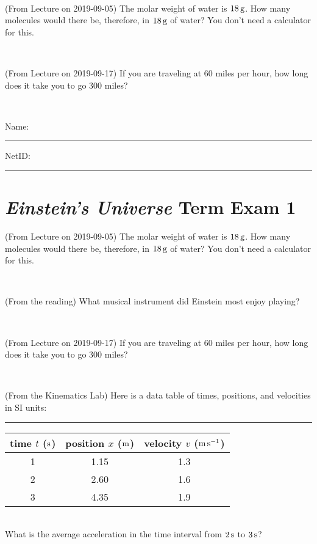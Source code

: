 \documentclass[12pt, letterpaper]{article}
\begin{document}
\vfill ~

\begin{problem} (From Lecture on 2019-09-05)
The molar weight of water is $18\,\mathrm{g}$. How many molecules would there
be, therefore, in $18\,\mathrm{g}$ of water? You don't need a calculator for
this.
\end{problem}


\vfill ~

\begin{problem} (From Lecture on 2019-09-17)
If you are traveling at 60 miles per hour, how long does
it take you to go 300 miles?
\end{problem}


\vfill ~


\cleardoublepage



\noindent
Name: \rule[-1ex]{0.60\textwidth}{0.1pt}
NetID: \rule[-1ex]{0.20\textwidth}{0.1pt}

\section*{\textsl{Einstein's Universe} Term Exam 1}
\setcounter{problem}{1}


\begin{problem} (From Lecture on 2019-09-05)
The molar weight of water is $18\,\mathrm{g}$. How many molecules would there
be, therefore, in $18\,\mathrm{g}$ of water? You don't need a calculator for
this.
\end{problem}


\vfill ~

\begin{problem} (From the reading)
What musical instrument did Einstein most enjoy playing?
\end{problem}


\vfill ~

\begin{problem} (From Lecture on 2019-09-17)
If you are traveling at 60 miles per hour, how long does
it take you to go 300 miles?
\end{problem}


\vfill ~

\begin{problem} (From the Kinematics Lab)
Here is a data table of times, positions, and velocities in SI units:\\
\rule{1.0in}{0pt}\begin{tabular}{c|c|c}
time $t$ ($\mathrm{s}$) & position $x$ ($\mathrm{m}$) & velocity $v$ ($\mathrm{m}\,\mathrm{s}^{-1}$) \\
\hline
1 & 1.15 & 1.3 \\
2 & 2.60 & 1.6 \\
3 & 4.35 & 1.9 \\
\hline
\end{tabular}\\
What is the average acceleration in the time interval from $2\,\mathrm{s}$ to $3\,\mathrm{s}$?
\end{problem}
\end{document}

